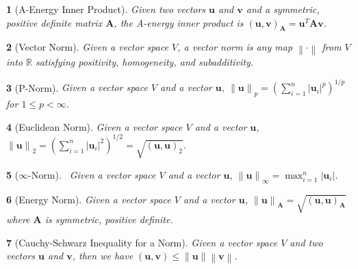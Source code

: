 \documentclass{article}
\theoremstyle{bolddef}
\newtheorem*{definition}{}
\begin{document}
\begin{definition}[A-Energy Inner Product]
    Given two vectors $\mathbf{u}$ and $\mathbf{v}$ and a symmetric, positive definite matrix $\mathbf{A}$, 
    the A-energy inner product is ${(\mathbf{u}, \mathbf{v})}_{\mathbf{A}} = \mathbf{u}^{T}\mathbf{A}\mathbf{v}$.
\end{definition}

\begin{definition}[Vector Norm]
    Given a vector space $\mathit{V}$, a vector norm is any map $\left\lVert \cdot \right\rVert$
    from $\mathit{V}$ into $\mathbb{R}$ satisfying positivity, homogeneity, and subadditivity.
\end{definition}

\begin{definition}[P-Norm]
    Given a vector space $\mathit{V}$ and a vector $\mathbf{u}$,
    ${\left\lVert \mathbf{u} \right\rVert}_p = {(\sum_{i = 1}^{n} {\left\lvert \mathbf{u}_{i} \right\rvert}^{p} )}^{1/p}$ for $1 \leq p < \infty$.
\end{definition}

\begin{definition}[Euclidean Norm]
    Given a vector space $\mathit{V}$ and a vector $\mathbf{u}$,
    ${\left\lVert \mathbf{u} \right\rVert}_2 = {(\sum_{i = 1}^{n} {\left\lvert \mathbf{u}_{i} \right\rvert}^{2} )}^{1/2} = \sqrt{{(\mathbf{u}, \mathbf{u})}_2}$.
\end{definition}

\begin{definition}[$\infty$-Norm]\
    Given a vector space $\mathit{V}$ and a vector $\mathbf{u}$,
    ${\left\lVert \mathbf{u} \right\rVert}_\infty = \max_{i = 1}^{n} {\left\lvert \mathbf{u}_{i} \right\rvert}$.
\end{definition}

\begin{definition}[Energy Norm]
    Given a vector space $\mathit{V}$ and a vector $\mathbf{u}$,
    ${\left\lVert \mathbf{u} \right\rVert}_\mathbf{A} = \sqrt{{(\mathbf{u}, \mathbf{u})}_\mathbf{A}}$ where $\mathbf{A}$ is symmetric, positive definite.
\end{definition}

\begin{definition}[Cauchy-Schwarz Inequality for a Norm]
    Given a vector space $\mathit{V}$ and two vectors $\mathbf{u}$ and $\mathbf{v}$, then we have
    $(\mathbf{u}, \mathbf{v}) \leq \left\lVert \mathbf{u} \right\rVert \left\lVert \mathbf{v} \right\rVert$.
\end{definition}
\end{document}
